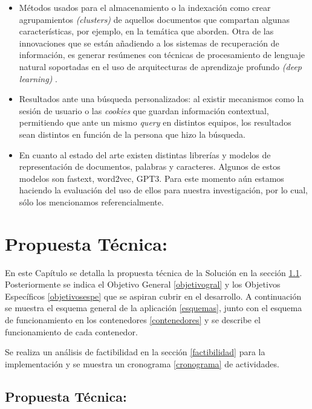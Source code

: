 \documentclass[
  10,
  openany]{book}
\begin{document}
\begin{itemize}
\item
  Métodos usados para el almacenamiento o la indexación como crear agrupamientos \emph{(clusters)} de aquellos documentos que compartan algunas características, por ejemplo, en la temática que aborden. Otra de las innovaciones que se están añadiendo a los sistemas de recuperación de información, es generar resúmenes con técnicas de procesamiento de lenguaje natural soportadas en el uso de arquitecturas de aprendizaje profundo \emph{(deep learning)} .
\item
  Resultados ante una búsqueda personalizados: al existir mecanismos como la sesión de usuario o las \emph{cookies} que guardan información contextual, permitiendo que ante un mismo \emph{query} en distintos equipos, los resultados sean distintos en función de la persona que hizo la búsqueda.
\item
  En cuanto al estado del arte existen distintas librerías y modelos de representación de documentos, palabras y caracteres. Algunos de estos modelos son fastext, word2vec, GPT3. Para este momento aún estamos haciendo la evaluación del uso de ellos para nuestra investigación, por lo cual, sólo los mencionamos referencialmente.
\end{itemize}

\hypertarget{propuesta-tuxe9cnica}{%
\chapter{Propuesta Técnica:}\label{propuesta-tuxe9cnica}}

En este Capítulo se detalla la propuesta técnica de la Solución en la sección \ref{propuestatec}. Posteriormente se indica el Objetivo General \ref{objetivogral} y los Objetivos Específicos \ref{objetivosespe} que se aspiran cubrir en el desarrollo. A continuación se muestra el esquema general de la aplicación \ref{esquemas}, junto con el esquema de funcionamiento en los contenedores \ref{contenedores} y se describe el funcionamiento de cada contenedor.

Se realiza un análisis de factibilidad en la sección \ref{factibilidad} para la implementación y se muestra un cronograma \ref{cronograma} de actividades.

\hypertarget{propuestatec}{%
\section{Propuesta Técnica:}\label{propuestatec}}
\end{document}
